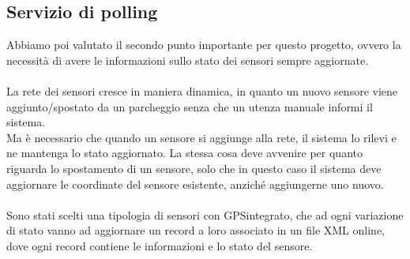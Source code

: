 \subsection{Servizio di polling}
Abbiamo poi valutato il secondo punto importante per questo progetto, ovvero
la necessità di avere le informazioni sullo stato dei sensori sempre aggiornate.
\\\\
La rete dei sensori cresce in maniera dinamica, in quanto un nuovo sensore viene aggiunto/spostato
da un parcheggio senza che un utenza manuale informi il sistema. 
\\
Ma è necessario che quando un sensore si aggiunge alla rete, il sistema lo rilevi e ne mantenga lo stato
aggiornato. La stessa cosa deve avvenire per quanto riguarda lo spostamento di un sensore, solo che in 
questo caso il sistema deve aggiornare le coordinate del sensore esistente, anziché aggiungerne uno nuovo.
\\\\
Sono stati scelti una tipologia di sensori con \gls{GPS}\glsfirstoccur integrato, che ad ogni variazione di stato vanno ad 
aggiornare un record a loro associato in un file \gls{XML} online, dove ogni record contiene le informazioni e
lo stato del sensore.
\\
